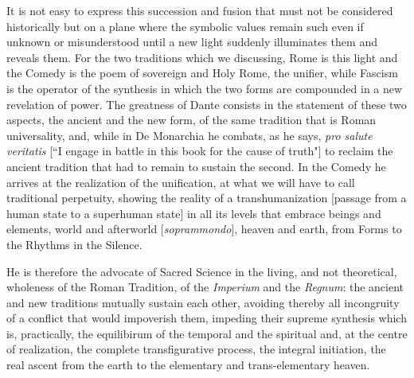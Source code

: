 It is not easy to express this succession and fusion that must not be considered historically but on a plane where the symbolic values remain such even if unknown or misunderstood until a new light suddenly illuminates them and reveals them. For the two traditions which we discussing, Rome is this light and the Comedy is the poem of sovereign and Holy Rome, the unifier, while Fascism is the operator of the synthesis in which the two forms are compounded in a new revelation of power. The greatness of Dante consists in the statement of these two aspects, the ancient and the new form, of the same tradition that is Roman universality, and, while in De Monarchia he combats, as he says, \emph{pro salute veritatis} [``I engage in battle in this book for the cause of truth"] to reclaim the ancient tradition that had to remain to sustain the second. In the Comedy he arrives at the realization of the unification, at what we will have to call traditional perpetuity, showing the reality of a transhumanization [passage from a human state to a superhuman state] in all its levels that embrace beings and elements, world and afterworld [\emph{soprammondo}], heaven and earth, from Forms to the Rhythms in the Silence.

He is therefore the advocate of Sacred Science in the living, and not theoretical, wholeness of the Roman Tradition, of the \emph{Imperium} and the \emph{Regnum}: the ancient and new traditions mutually sustain each other, avoiding thereby all incongruity of a conflict that would impoverish them, impeding their supreme synthesis which is, practically, the equilibirum of the temporal and the spiritual and, at the centre of realization, the complete transfigurative process, the integral initiation, the real ascent from the earth to the elementary and trans-elementary heaven.




